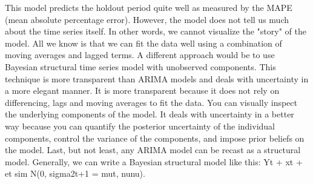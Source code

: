 {}This model predicts the holdout period quite well as measured by the MAPE (mean absolute percentage error). However, the model does not tell us much about the time series itself. In other words, we cannot visualize the "story" of the model. All we know is that we can fit the data well using a combination of moving averages and lagged terms.\markdownRendererInterblockSeparator
{}\markdownRendererInterblockSeparator
{}A different approach would be to use Bayesian structural time series model with unobserved components. This technique is more transparent than ARIMA models and deals with uncertainty in a more elegant manner. It is more transparent because it does not rely on differencing, lags and moving averages to fit the data. You can visually inspect the underlying components of the model. It deals with uncertainty in a better way because you can quantify the posterior uncertainty of the individual components, control the variance of the components, and impose prior beliefs on the model. Last, but not least, any ARIMA model can be recast as a structural model.\markdownRendererInterblockSeparator
{}Generally, we can write a Bayesian structural model like this:\markdownRendererInterblockSeparator
{}\markdownRendererDollarSign{}\markdownRendererDollarSign{} Yt + xt + et \markdownRendererBackslash{}sim N(0, \markdownRendererBackslash{}sigma\markdownRendererCircumflex{}2\markdownRendererLeftBrace{}t+1\markdownRendererRightBrace{} = \markdownRendererBackslash{}mut, \markdownRendererBackslash{}nu\markdownRendererLeftBrace{}\markdownRendererBackslash{}nu\markdownRendererRightBrace{}). \markdownRendererDollarSign{}\markdownRendererDollarSign{}\markdownRendererInterblockSeparator
